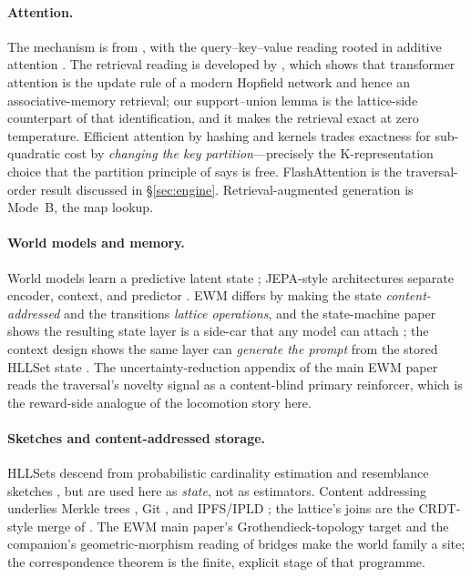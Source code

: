 \documentclass[11pt,a4paper]{article}
\theoremstyle{remark}
\begin{document}
\paragraph{Attention.} The mechanism is from \cite{vaswani2017}, with the
query--key--value reading rooted in additive attention \cite{bahdanau2015}. The
retrieval reading is developed by \cite{ramsauer2020}, which shows that
transformer attention is the update rule of a modern Hopfield network and hence
an associative-memory retrieval; our support--union lemma is the lattice-side
counterpart of that identification, and it makes the retrieval exact at zero
temperature. Efficient attention by hashing and kernels
\cite{kitaev2020,choromanski2021} trades exactness for sub-quadratic cost by
\emph{changing the key partition}---precisely the K-representation choice that
the partition principle of \cite{kspace2026} says is free. FlashAttention
\cite{dao2022} is the traversal-order result discussed in \S\ref{sec:engine}.
Retrieval-augmented generation \cite{lewis2020} is Mode~B, the map lookup.

\paragraph{World models and memory.} World models learn a predictive latent
state \cite{ha2018}; JEPA-style architectures separate encoder, context, and
predictor \cite{lecun2022}. EWM differs by making the state
\emph{content-addressed} and the transitions \emph{lattice operations}, and the
state-machine paper shows the resulting state layer is a side-car that any
model can attach \cite{state2026}; the context design shows the same layer can
\emph{generate the prompt} from the stored HLLSet state \cite{ctx2026}. The
uncertainty-reduction appendix of the main EWM paper \cite{ewm2026,lincoln2026}
reads the traversal's novelty signal as a content-blind primary reinforcer,
which is the reward-side analogue of the locomotion story here.

\paragraph{Sketches and content-addressed storage.} HLLSets descend from
probabilistic cardinality estimation \cite{flajolet2007} and resemblance
sketches \cite{broder1997,bloom1970}, but are used here as \emph{state}, not as
estimators. Content addressing underlies Merkle trees \cite{merkle1988},
Git \cite{git}, and IPFS/IPLD \cite{benet2014}; the lattice's joins are the
CRDT-style merge of \cite{shapiro2011}. The EWM main paper's
Grothendieck-topology target \cite{grothendieck1972} and the companion's
geometric-morphism reading of bridges make the world family a site; the
correspondence theorem is the finite, explicit stage of that programme.
\end{document}
